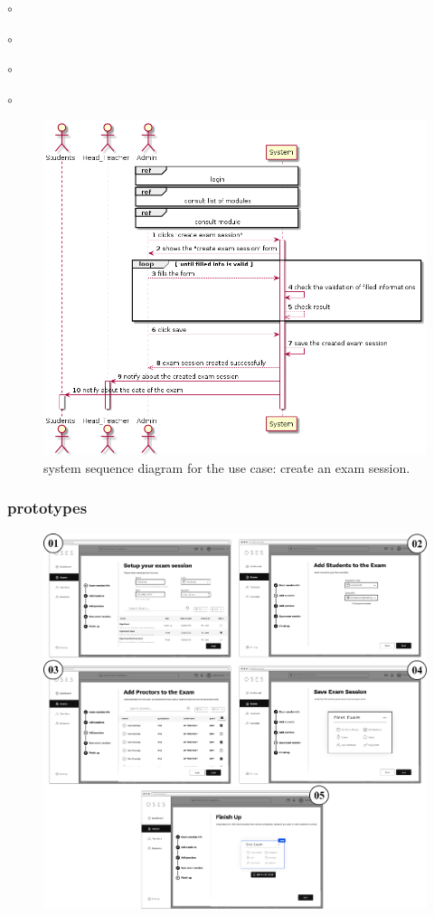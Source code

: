 \documentclass[]{uc2pfecaneva}
\begin{document}
\begin{list}{$\circ$}{}
\begin{list}{$\circ$}{}
\begin{list}{$\circ$}{}
\begin{list}{$\circ$}{}
\begin{figure}[h]
        \centering
        \includegraphics[width=\textwidth]{images/create_exam_session}

        \caption{system sequence diagram for the use case: create an exam session.}
    \end{figure}
    \clearpage

    \subsubsection{prototypes}
    \begin{figure}[h]

        \centering
        \includegraphics[width=\textwidth]{images/prototypes_create_exam_session}


\end{figure}
\end{list}
\end{list}
\end{list}
\end{list}
\end{document}
